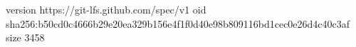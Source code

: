 version https://git-lfs.github.com/spec/v1
oid sha256:b50cd0c4666b29e20ea329b156e4f1f0d40e98b809116bd1cec0e26d4c40c3af
size 3458
